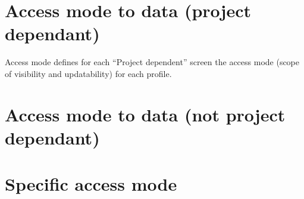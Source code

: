 \documentclass[letterpaper,10pt,english]{sphinxmanual}
\begin{document}

\section{Access mode to data (project dependant)}
\label{AccessRights:index-4}\label{AccessRights:access-mode-to-data-project-dependant}
Access mode defines for each “Project dependent” screen the access mode (scope of visibility and updatability) for each profile.


\section{Access mode to data (not project dependant)}
\label{AccessRights:index-5}\label{AccessRights:access-mode-to-data-not-project-dependant}

\section{Specific access mode}
\label{AccessRights:index-6}\label{AccessRights:specific-access-mode}
\end{document}
